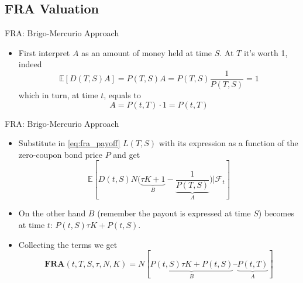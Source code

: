 \documentclass{beamer}
\begin{document}
\subsection{FRA Valuation}
\begin{frame}{FRA: Brigo-Mercurio Approach}
	\begin{itemize}
		\item<2-> First interpret $A$ as an amount of money held at time $S$. At $T$ it's worth 1, indeed 
		\begin{equation*}
			\mathbb{E}[D(T,S)A] = P(T,S)A = P(T,S)\frac{1}{P(T,S)}=1
		\end{equation*}
		which in turn, at time $t$, equals to
		\begin{equation*}
			A = P(t,T)\cdot 1 = P(t,T)
		\end{equation*}
	\end{itemize}
\end{frame}

\begin{frame}{FRA: Brigo-Mercurio Approach}
	\begin{itemize}
		\item Substitute in \cref{eq:fra_payoff} $L(T,S)$ with its expression as a function of the zero-coupon bond price $P$ and get
		\begin{equation*}
			\mathbb{E}\left[D(t, S) N\bigg(\underbrace{\tau K + 1}_{B} - \underbrace{\frac{1}{P(T, S)}}_{A}\bigg)\bigg| \mathcal{F}_t\right]
		\end{equation*}
		\item<1-> On the other hand $B$ (remember the payout is expressed at time $S$) becomes at time $t$:
		$P(t,S)\tau K + P(t, S)$.
		\item<2-> Collecting the terms we get
		\begin{equation}
			\boxed{\textbf{FRA}(t,T,S,\tau,N,K)=N[\underbrace{P(t,S)\tau K+P(t,S)}_{B}–\underbrace{P(t,T)}_{A}]}
		\end{equation}
	\end{itemize}
	\myendproof
\end{frame}
\end{document}
